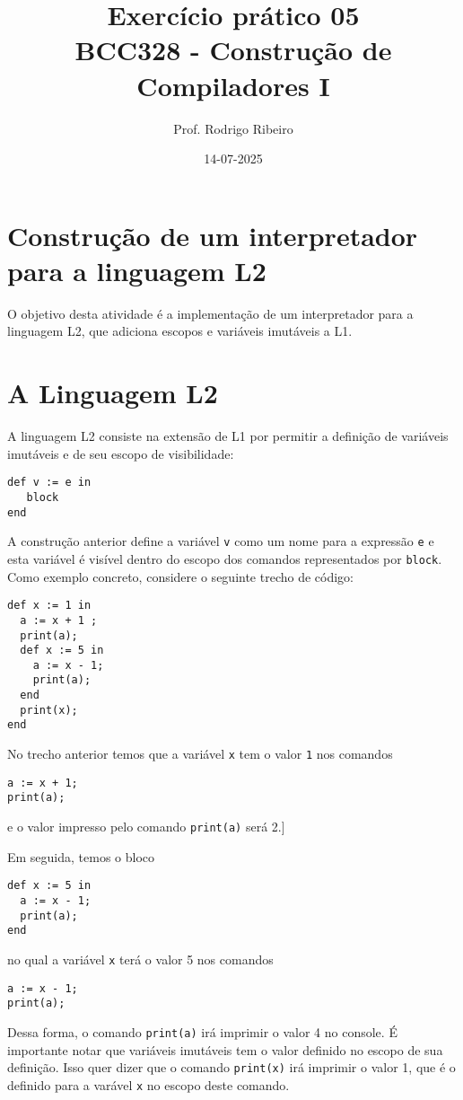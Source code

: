 \documentclass[a4paper,11pt]{article}
\author{Prof. Rodrigo Ribeiro}
\date{14-07-2025}
\title{Exercício prático 05\\\medskip
\large BCC328 - Construção de Compiladores I}
\begin{document}
\maketitle
\section*{Construção de um interpretador para a linguagem L2}
\label{sec:org78fc58e}

O objetivo desta atividade é a implementação de um interpretador para  a linguagem L2,
que adiciona escopos e variáveis imutáveis a L1.
\section*{A Linguagem L2}
\label{sec:orgb8a3f14}

A linguagem L2 consiste na extensão de L1 por permitir a definição de variáveis imutáveis
e de seu escopo de visibilidade:

\begin{verbatim}
def v := e in
   block
end
\end{verbatim}

A construção anterior define a variável \texttt{v} como um nome para a expressão \texttt{e} e esta variável
é visível dentro do escopo dos comandos representados por \texttt{block}. Como exemplo concreto,
considere o seguinte trecho de código:

\begin{verbatim}
def x := 1 in
  a := x + 1 ;
  print(a);
  def x := 5 in
    a := x - 1;
    print(a);
  end
  print(x);
end
\end{verbatim}

No trecho anterior temos que a variável \texttt{x} tem o valor \texttt{1} nos comandos
\begin{verbatim}
a := x + 1;
print(a);
\end{verbatim}
e o valor impresso pelo comando \texttt{print(a)} será 2.]

Em seguida, temos o bloco

\begin{verbatim}
def x := 5 in
  a := x - 1;
  print(a);
end
\end{verbatim}
no qual a variável \texttt{x} terá o valor 5 nos comandos
\begin{verbatim}
a := x - 1;
print(a);
\end{verbatim}
Dessa forma, o comando \texttt{print(a)} irá imprimir o valor 4 no console.
É importante notar que variáveis imutáveis tem o valor definido no
escopo de sua definição. Isso quer dizer que o comando \texttt{print(x)}
irá imprimir o valor 1, que é o definido para a varável \texttt{x} no escopo
deste comando.
\end{document}
